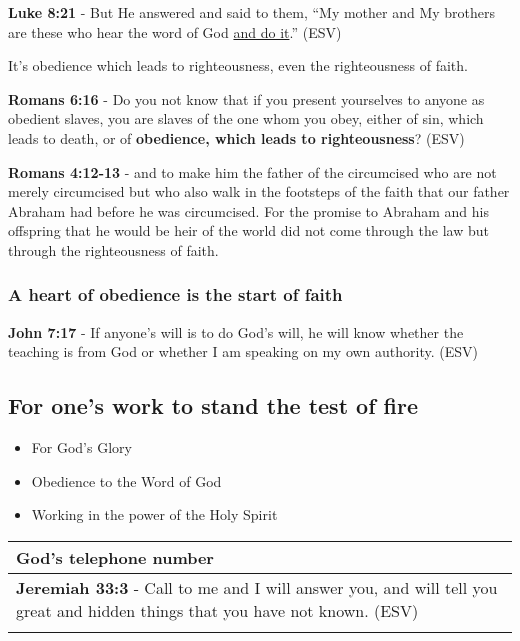 \documentclass[11pt]{article}
\begin{document}
\textbf{Luke 8:21} - But He answered and said to them, “My mother and My brothers are these who hear the word of God \uline{and do it}.” (ESV)

It's obedience which leads to righteousness, even the righteousness of faith.

\textbf{Romans 6:16} - Do you not know that if you present yourselves to anyone as obedient slaves, you are slaves of the one whom you obey, either of sin, which leads to death, or of \textbf{obedience, which leads to righteousness}? (ESV)

\textbf{Romans 4:12-13} - and to make him the father of the circumcised who are not merely circumcised but who also walk in the footsteps of the faith that our father Abraham had before he was circumcised. For the promise to Abraham and his offspring that he would be heir of the world did not come through the law but through the righteousness of faith.

\subsubsection{A heart of obedience is the start of faith}
\label{sec:org60a79bd}

\textbf{John 7:17} -  If anyone's will is to do God's will, he will know whether the teaching is from God or whether I am speaking on my own authority.  (ESV)

\subsection{For one's work to stand the test of fire}
\label{sec:org061282d}
\begin{itemize}
\item For God's Glory
\item Obedience to the Word of God
\item Working in the power of the Holy Spirit
\end{itemize}

\begin{center}
\begin{tabular}{l}
God's telephone number\\[0pt]
\hline
\textbf{Jeremiah 33:3} - Call to me and I will answer you, and will tell you great and hidden things that you have not known. (ESV)\\[0pt]
\\[0pt]
\end{tabular}
\end{center}
\end{document}
